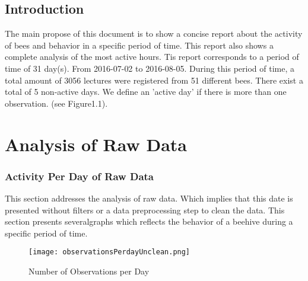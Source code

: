 \documentclass[11pt,fleqn]{book} %
\begin{document}
\section{Introduction}%
\label{sec:Introduction}%
The main propose of this document  is to show a concise report about the activity of bees and behavior in a specific period of time. This report also shows a complete analysis of the most active hours.\newline%
\newline%
Tis report corresponds to a period of time of 31 day(s). From 2016{-}07{-}02 to 2016{-}08{-}05. During this period of time, a total amount of 3056 lectures were registered from 51 different bees. There exist a total of 5 non{-}active days. We define an 'active day' if there is more than one observation. (see Figure1.1).\newline%
\newline%

\chapter{Analysis of Raw Data} 
\normalsize%
\subsection{Activity Per Day of Raw Data}%
\label{subsec:Activity Per Day of Raw Data}%
This section addresses the analysis of raw data. Which implies that this date is presented without filters or a data preprocessing step to clean the data. This section presents severalgraphs which reflects the behavior of a beehive during a specific period of time.%


\begin{figure}[h!]%
\centering%
\texttt{[image: observationsPerdayUnclean.png]}%
\caption{Number of Observations per Day}%
\end{figure}
\end{document}
